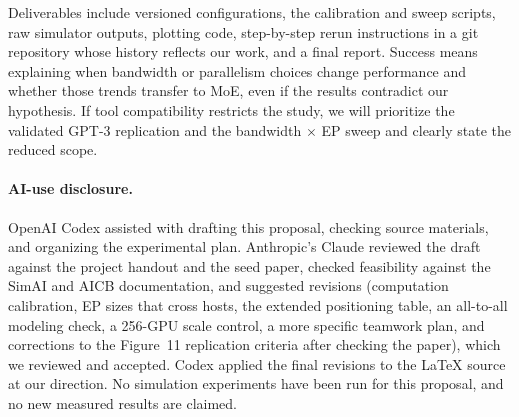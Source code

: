 \documentclass[letterpaper,twocolumn,10pt]{article}
\begin{document}
Deliverables include versioned configurations, the calibration and sweep scripts, raw simulator outputs, plotting code, step-by-step rerun instructions in a git repository whose history reflects our work, and a final report. Success means explaining when bandwidth or parallelism choices change performance and whether those trends transfer to MoE, even if the results contradict our hypothesis. If tool compatibility restricts the study, we will prioritize the validated GPT-3 replication and the bandwidth $\times$ EP sweep and clearly state the reduced scope.

\paragraph{AI-use disclosure.} OpenAI Codex assisted with drafting this proposal, checking source materials, and organizing the experimental plan. Anthropic's Claude reviewed the draft against the project handout and the seed paper, checked feasibility against the SimAI and AICB documentation, and suggested revisions (computation calibration, EP sizes that cross hosts, the extended positioning table, an all-to-all modeling check, a 256-GPU scale control, a more specific teamwork plan, and corrections to the Figure~11 replication criteria after checking the paper), which we reviewed and accepted. Codex applied the final revisions to the LaTeX source at our direction. No simulation experiments have been run for this proposal, and no new measured results are claimed.
\end{document}
